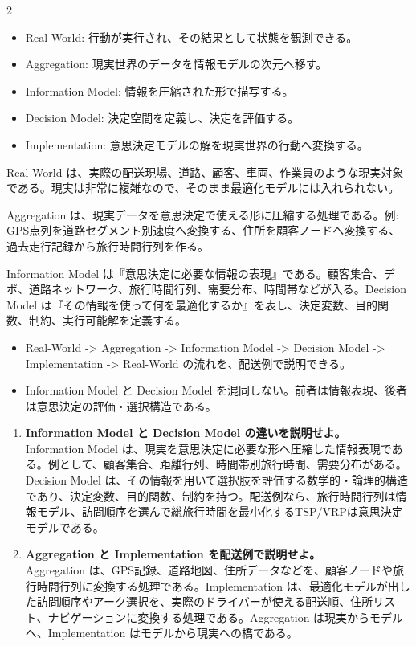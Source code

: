 \clearpage
{}
\begin{multicols}{2}\footnotesize\raggedcolumns
{}
\begin{itemize}
\item Real-World: 行動が実行され、その結果として状態を観測できる。
\item Aggregation: 現実世界のデータを情報モデルの次元へ移す。
\item Information Model: 情報を圧縮された形で描写する。
\item Decision Model: 決定空間を定義し、決定を評価する。
\item Implementation: 意思決定モデルの解を現実世界の行動へ変換する。
\end{itemize}
Real-World は、実際の配送現場、道路、顧客、車両、作業員のような現実対象である。現実は非常に複雑なので、そのまま最適化モデルには入れられない。\par

Aggregation は、現実データを意思決定で使える形に圧縮する処理である。例: GPS点列を道路セグメント別速度へ変換する、住所を顧客ノードへ変換する、過去走行記録から旅行時間行列を作る。\par

Information Model は『意思決定に必要な情報の表現』である。顧客集合、デポ、道路ネットワーク、旅行時間行列、需要分布、時間帯などが入る。Decision Model は『その情報を使って何を最適化するか』を表し、決定変数、目的関数、制約、実行可能解を定義する。\par
{}
\begin{itemize}
\item Real-World -> Aggregation -> Information Model -> Decision Model -> Implementation -> Real-World の流れを、配送例で説明できる。
\item Information Model と Decision Model を混同しない。前者は情報表現、後者は意思決定の評価・選択構造である。
\end{itemize}
\begin{enumerate}
\item \textbf{Information Model と Decision Model の違いを説明せよ。}\\Information Model は、現実を意思決定に必要な形へ圧縮した情報表現である。例として、顧客集合、距離行列、時間帯別旅行時間、需要分布がある。Decision Model は、その情報を用いて選択肢を評価する数学的・論理的構造であり、決定変数、目的関数、制約を持つ。配送例なら、旅行時間行列は情報モデル、訪問順序を選んで総旅行時間を最小化するTSP/VRPは意思決定モデルである。
\item \textbf{Aggregation と Implementation を配送例で説明せよ。}\\Aggregation は、GPS記録、道路地図、住所データなどを、顧客ノードや旅行時間行列に変換する処理である。Implementation は、最適化モデルが出した訪問順序やアーク選択を、実際のドライバーが使える配送順、住所リスト、ナビゲーションに変換する処理である。Aggregation は現実からモデルへ、Implementation はモデルから現実への橋である。
\end{enumerate}
\end{multicols}

